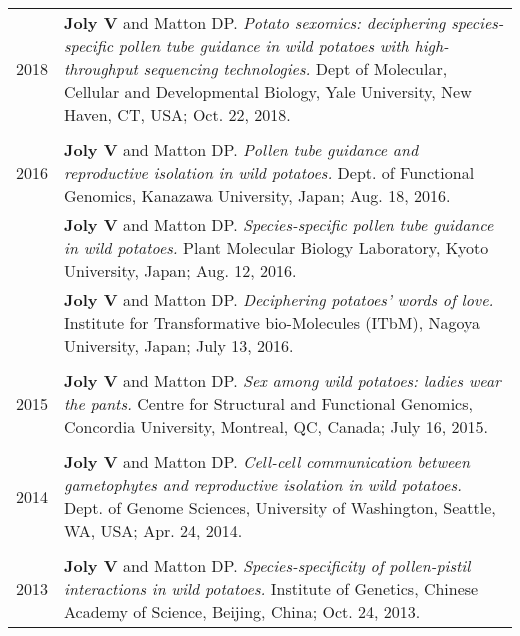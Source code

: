 \documentclass[letterpaper,12pt]{article}
\begin{document}
\begin{tabularx}{\textwidth}{@{}r|X@{}}

2018
& \textbf{Joly V} and Matton DP.
  \emph{Potato sexomics: deciphering species-specific pollen tube guidance in
  wild potatoes with high-throughput sequencing technologies.}
  Dept of Molecular, Cellular and Developmental Biology,
  Yale University, New Haven, CT, USA;
  Oct. 22, 2018.
  \\

\multicolumn{2}{c}{} \\

2016
& \textbf{Joly V} and Matton DP.
  \emph{Pollen tube guidance and reproductive isolation in wild potatoes.}
  Dept. of Functional Genomics,
  Kanazawa University, Japan;
  Aug. 18, 2016.
  \vspace{1.5mm}
  \\

& \textbf{Joly V} and Matton DP.
  \emph{Species-specific pollen tube guidance in wild potatoes.}
  Plant Molecular Biology Laboratory,
  Kyoto University, Japan;
  Aug. 12, 2016.
  \vspace{1.5mm}
  \\

& \textbf{Joly V} and Matton DP.
  \emph{Deciphering potatoes’ words of love.}
  Institute for Transformative bio-Molecules (ITbM),
  Nagoya University, Japan;
  July 13, 2016.
  \\

\multicolumn{2}{c}{} \\

2015
& \textbf{Joly V} and Matton DP.
  \emph{Sex among wild potatoes: ladies wear the pants.}
  Centre for Structural and Functional Genomics,
  Concordia University, Montreal, QC, Canada;
  July 16, 2015.
  \\

\multicolumn{2}{c}{} \\

2014
& \textbf{Joly V} and Matton DP.
  \emph{Cell-cell communication between gametophytes and reproductive isolation
  in wild potatoes.}
  Dept. of Genome Sciences, University of Washington, Seattle, WA, USA;
  Apr. 24, 2014.
  \\

\multicolumn{2}{c}{} \\

2013
& \textbf{Joly V} and Matton DP.
  \emph{Species-specificity of pollen-pistil interactions in wild potatoes.}
  Institute of Genetics, Chinese Academy of Science, Beijing, China;
  Oct. 24, 2013.
  \\

\end{tabularx}
\end{document}
